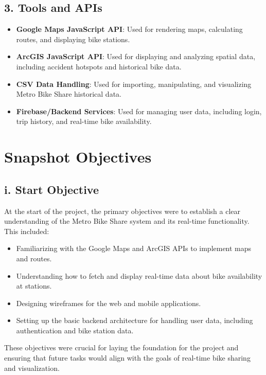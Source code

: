\documentclass[12pt]{article}
\begin{document}
\subsection*{3. Tools and APIs}
\begin{itemize}
    \item \textbf{Google Maps JavaScript API}: Used for rendering maps, calculating routes, and displaying bike stations.
    \item \textbf{ArcGIS JavaScript API}: Used for displaying and analyzing spatial data, including accident hotspots and historical bike data.
    \item \textbf{CSV Data Handling}: Used for importing, manipulating, and visualizing Metro Bike Share historical data.
    \item \textbf{Firebase/Backend Services}: Used for managing user data, including login, trip history, and real-time bike availability.
\end{itemize}

\newpage

\section*{Snapshot Objectives}

\subsection*{i. Start Objective}
At the start of the project, the primary objectives were to establish a clear understanding of the Metro Bike Share system and its real-time functionality. This included:
\begin{itemize}
    \item Familiarizing with the Google Maps and ArcGIS APIs to implement maps and routes.
    \item Understanding how to fetch and display real-time data about bike availability at stations.
    \item Designing wireframes for the web and mobile applications.
    \item Setting up the basic backend architecture for handling user data, including authentication and bike station data.
\end{itemize}
These objectives were crucial for laying the foundation for the project and ensuring that future tasks would align with the goals of real-time bike sharing and visualization.
\end{document}
